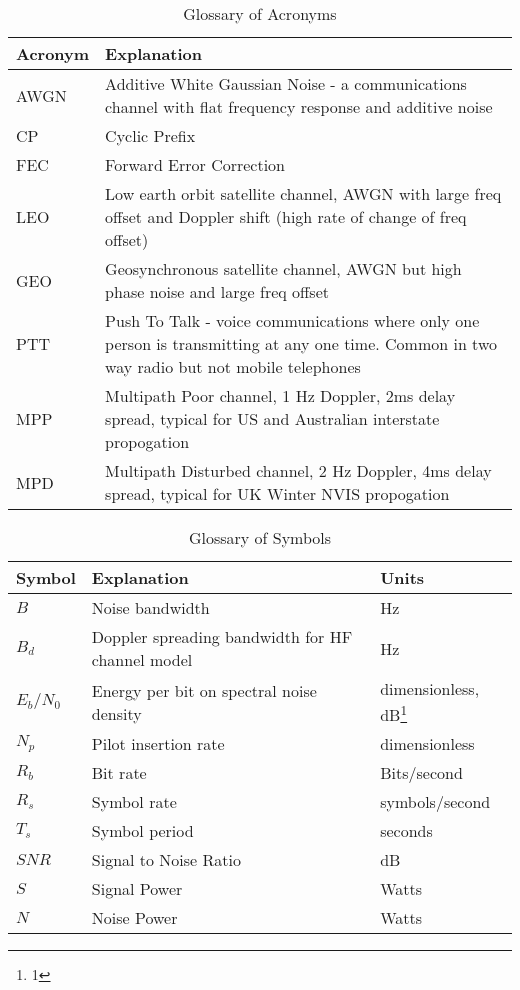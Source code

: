 \documentclass{article}
\begin{document}
\begin{table}[h]
\centering
\begin{tabular}{l p{8cm} }
 \hline
 Acronym & Explanation \\
 \hline
 AWGN & Additive White Gaussian Noise - a communications channel with flat frequency response and additive noise \\
 CP & Cyclic Prefix \\
 FEC & Forward Error Correction \\
 LEO & Low earth orbit satellite channel, AWGN with large freq offset and Doppler shift (high rate of change of freq offset) \\
 GEO & Geosynchronous satellite channel, AWGN but high phase noise and large freq offset \\
 PTT & Push To Talk - voice communications where only one person is transmitting at any one time.  Common in two way radio but not mobile telephones  \\
 MPP & Multipath Poor channel, 1 Hz Doppler, 2ms delay spread, typical for US and Australian interstate propogation \\
 MPD & Multipath Disturbed channel, 2 Hz Doppler, 4ms delay spread, typical for UK Winter NVIS propogation \\
 \hline
\end{tabular}
\caption{Glossary of Acronyms}
\end{table}

\begin{table}[h]
\centering
\begin{tabular}{l l l}
 \hline
 Symbol & Explanation & Units \\
 \hline
 $B$ & Noise bandwidth & Hz \\
 $B_d$ & Doppler spreading bandwidth for HF channel model & Hz \\
 $E_b/N_0$ & Energy per bit on spectral noise density & dimensionless, dB\footnote{1} \\
 $N_p$ & Pilot insertion rate & dimensionless \\
 $R_b$ & Bit rate & Bits/second \\
 $R_s$ & Symbol rate & symbols/second \\
 $T_s$ & Symbol period & seconds \\
 $SNR$ & Signal to Noise Ratio & dB \\
 $S$ & Signal Power & Watts \\
 $N$ & Noise Power & Watts \\
 \hline
\end{tabular}
\caption{Glossary of Symbols}
\end{table}
\end{document}
